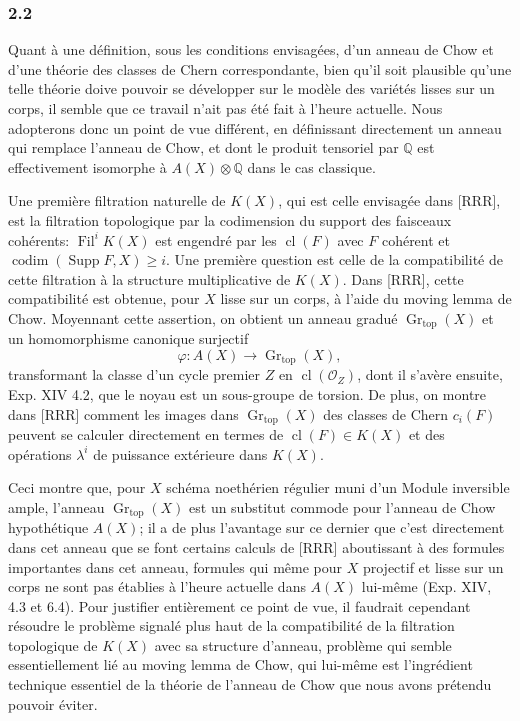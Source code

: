 \documentclass[11pt]{article}
\newcommand{\Gr}{\operatorname{Gr}}
\newcommand{\Fil}{\operatorname{Fil}}
\newcommand{\cl}{\operatorname{cl}}
\providecommand{\Gr}{\operatorname{Gr}}
\providecommand{\Gr}{\operatorname{G}}
\begin{document}
\subsubsection*{2.2}
Quant à une définition, sous les conditions envisagées, d'un anneau de Chow et d'une théorie des classes de Chern correspondante, bien qu'il soit plausible qu'une telle théorie doive pouvoir se développer sur le modèle des variétés lisses sur un corps, il semble que ce travail n'ait pas été fait à l'heure actuelle. Nous adopterons donc un point de vue différent, en définissant directement un anneau qui remplace l'anneau de Chow, et dont le produit tensoriel par $\mathbb Q$ est effectivement isomorphe à $A(X)\otimes\mathbb Q$ dans le cas classique.

Une première filtration naturelle de $K(X)$, qui est celle envisagée dans [RRR], est la filtration topologique par la codimension du support des faisceaux cohérents: $\Fil^iK(X)$ est engendré par les $\cl(F)$ avec $F$ cohérent et $\operatorname{codim}(\operatorname{Supp}F,X)\ge i$. Une première question est celle de la compatibilité de cette filtration à la structure multiplicative de $K(X)$. Dans [RRR], cette compatibilité est obtenue, pour $X$ lisse sur un corps, à l'aide du moving lemma de Chow. Moyennant cette assertion, on obtient un anneau gradué $\Gr_{\mathrm{top}}(X)$ et un homomorphisme canonique surjectif
\[
\varphi:A(X)\longrightarrow \Gr_{\mathrm{top}}(X),
\]
transformant la classe d'un cycle premier $Z$ en $\cl(\mathcal O_Z)$, dont il s'avère ensuite, Exp. XIV 4.2, que le noyau est un sous-groupe de torsion. De plus, on montre dans [RRR] comment les images dans $\Gr_{\mathrm{top}}(X)$ des classes de Chern $c_i(F)$ peuvent se calculer directement en termes de $\cl(F)\in K(X)$ et des opérations $\lambda^i$ de puissance extérieure dans $K(X)$.

Ceci montre que, pour $X$ schéma noethérien régulier muni d'un Module inversible ample, l'anneau $\Gr_{\mathrm{top}}(X)$ est un substitut commode pour l'anneau de Chow hypothétique $A(X)$; il a de plus l'avantage sur ce dernier que c'est directement dans cet anneau que se font certains calculs de [RRR] aboutissant à des formules importantes dans cet anneau, formules qui même pour $X$ projectif et lisse sur un corps ne sont pas établies à l'heure actuelle dans $A(X)$ lui-même (Exp. XIV, 4.3 et 6.4). Pour justifier entièrement ce point de vue, il faudrait cependant résoudre le problème signalé plus haut de la compatibilité de la filtration topologique de $K(X)$ avec sa structure d'anneau, problème qui semble essentiellement lié au moving lemma de Chow, qui lui-même est l'ingrédient technique essentiel de la théorie de l'anneau de Chow que nous avons prétendu pouvoir éviter.
\end{document}
